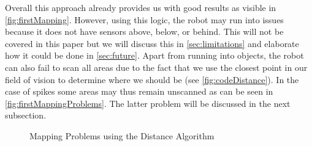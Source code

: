 \documentclass[twoside, 12pt]{article}
\begin{document}
\begin{figure}
\vspace{-50pt}
\end{figure}

Overall this approach already provides us with good results as visible in \autoref{fig:firstMapping}. However, using this logic, the robot may run into issues because it does not have sensors above, below, or behind. This will not be covered in this paper but we will discuss this in \autoref{sec:limitations} and elaborate how it could be done in \autoref{sec:future}. Apart from running into objects, the robot can also fail to scan all areas due to the fact that we use the closest point in our field of vision to determine where we should be (see \autoref{fig:codeDistance}). In the case of spikes some areas may thus remain unscanned as can be seen in \autoref{fig:firstMappingProblems}. The latter problem will be discussed in the next subsection.\\

\begin{figure}
\vspace{-28pt}
  \begin{center}
  \end{center}
\vspace{-20pt}
  \caption{Mapping Problems using the Distance Algorithm}
  \label{fig:firstMappingProblems}
\vspace{20pt}
\end{figure}
\end{document}
